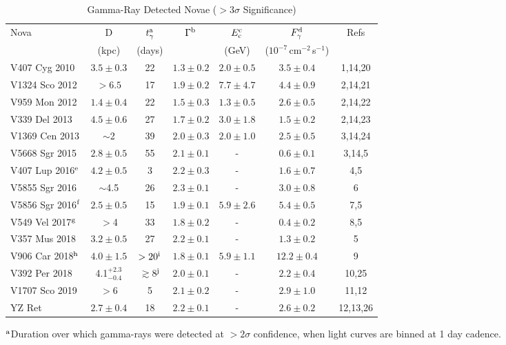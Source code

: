 \begin{table}[h]
\caption{Gamma-Ray Detected Novae ($>3 \sigma$ Significance)}
\label{stab:gammaray}
\begin{center}
\begin{tabular}{@{}l|c|c|c|c|c|c@{}}
\hline
Nova & D& $t_{\gamma}^{\rm a}$ & $\Gamma^{\rm b}$ & $E_{\rm c}^{\rm c}$ & $F_{\gamma}^{\rm d}$ & Refs\\
& (kpc) & (days) & & (GeV) & ($10^{-7}$\,cm$^{-2}$\,s$^{-1}$)  & \\
\hline
V407 Cyg 2010 &$3.5\pm 0.3$ & 22 & $1.3\pm0.2$ & $2.0\pm0.5$ &$3.5\pm0.4$ & 1,14,20\\
V1324 Sco 2012 &$>6.5$ & 17 & $1.9\pm0.2$ & $7.7\pm4.7$ & $4.4\pm0.9$ & 2,14,21\\
V959 Mon 2012 & $1.4\pm0.4$ & 22 & $1.5\pm0.3$ & $1.3\pm0.5$ & $2.6\pm0.5$ & 2,14,22\\
V339 Del 2013 & $4.5\pm 0.6$ & 27 & $1.7\pm0.2$ & $3.0\pm1.8$ & $1.5\pm0.2$ & 2,14,23\\
V1369 Cen 2013 & $\sim$2 & 39 & $2.0\pm0.3$ & $2.0\pm1.0$ & $2.5\pm0.5$ & 3,14,24\\
V5668 Sgr 2015 & $2.8\pm0.5$ & 55 & $2.1\pm0.1$ & -  & $0.6\pm0.1$ & 3,14,5\\
V407 Lup 2016$^{\rm e}$ & $4.2\pm0.5$ & 3  & $2.2\pm0.3$ & -  & $1.6\pm0.7$ & 4,5\\ 
V5855 Sgr 2016 & $\sim$4.5  & 26 & $2.3\pm0.1$ & - & $3.0\pm0.8$ & 6\\
V5856 Sgr 2016$^{\rm f}$ & $2.5\pm0.5$ & 15 & $1.9\pm0.1$ & $5.9\pm2.6$ & $5.4\pm0.5$ & 7,5\\
V549 Vel 2017$^{\rm g}$ & $>$4 & 33 & $1.8\pm0.2$ & - & $0.4\pm0.2$ & 8,5\\  
V357 Mus 2018 & $3.2\pm0.5$ & 27 & $2.2\pm0.1$ & - & $1.3\pm0.2$ & 5 \\ 
V906 Car 2018$^{\rm h}$ & $4.0\pm1.5$ & $>20^{\rm i}$ & $1.8\pm 0.1$ & $5.9 \pm 1.1$ & $12.2\pm0.4$ & 9\\
V392 Per 2018 & 4.1$^{+2.3}_{-0.4}$ & $\gtrsim$8$^{\rm j}$ & $2.0\pm0.1$ & - & $2.2\pm0.4$ & 10,25 \\ 
V1707 Sco 2019 & $>$6 & 5 & $2.1\pm0.2$ & - & $2.9\pm1.0$ & 11,12\\
YZ Ret & $2.7\pm0.4$ & 18 & $2.2\pm0.1$ & - & $2.6\pm0.2$ & 12,13,26\\
\hline
\end{tabular}
\end{center}
\begin{tabnote}
$^{\rm a}$Duration over which gamma-rays were detected at $>2 \sigma$ confidence, when light curves are binned at 1 day cadence.

\end{tabnote}
\end{table}

